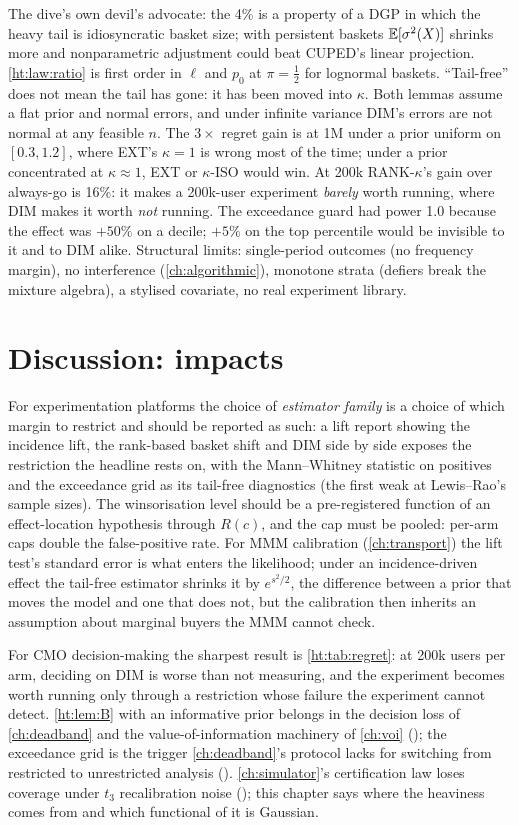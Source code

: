 The dive's own devil's advocate: the 4\% is a property of a DGP in which the heavy tail is idiosyncratic basket size; with persistent baskets $\mathbb{E}[\sigma^2(X)]$ shrinks more and nonparametric adjustment could beat CUPED's linear projection. \cref{ht:law:ratio} is first order in $\ell$ and $p_0$ at $\pi = \tfrac12$ for lognormal baskets. ``Tail-free'' does not mean the tail has gone: it has been moved into $\kappa$. Both lemmas assume a flat prior and normal errors, and under infinite variance DIM's errors are not normal at any feasible $n$. The $3\times$ regret gain is at 1M under a prior uniform on $[0.3, 1.2]$, where EXT's $\kappa = 1$ is wrong most of the time; under a prior concentrated at $\kappa \approx 1$, EXT or $\kappa$-ISO would win. At 200k RANK-$\kappa$'s gain over always-go is 16\%: it makes a 200k-user experiment \emph{barely} worth running, where DIM makes it worth \emph{not} running. The exceedance guard had power 1.0 because the effect was $+50\%$ on a decile; $+5\%$ on the top percentile would be invisible to it and to DIM alike. Structural limits: single-period outcomes (no frequency margin), no interference (\cref{ch:algorithmic}), monotone strata (defiers break the mixture algebra), a stylised covariate, no real experiment library.

\section{Discussion: impacts}

For experimentation platforms the choice of \emph{estimator family} is a choice of which margin to restrict and should be reported as such: a lift report showing the incidence lift, the rank-based basket shift and DIM side by side exposes the restriction the headline rests on, with the Mann--Whitney statistic on positives and the exceedance grid as its tail-free diagnostics (the first weak at Lewis--Rao's sample sizes). The winsorisation level should be a pre-registered function of an effect-location hypothesis through $R(c)$, and the cap must be pooled: per-arm caps double the false-positive rate. For MMM calibration (\cref{ch:transport}) the lift test's standard error is what enters the likelihood; under an incidence-driven effect the tail-free estimator shrinks it by $e^{s^2/2}$, the difference between a prior that moves the model and one that does not, but the calibration then inherits an assumption about marginal buyers the MMM cannot check.

For CMO decision-making the sharpest result is \cref{ht:tab:regret}: at 200k users per arm, deciding on DIM is worse than not measuring, and the experiment becomes worth running only through a restriction whose failure the experiment cannot detect. \cref{ht:lem:B} with an informative prior belongs in the decision loss of \cref{ch:deadband} and the value-of-information machinery of \cref{ch:voi} (); the exceedance grid is the trigger \cref{ch:deadband}'s protocol lacks for switching from restricted to unrestricted analysis (). \cref{ch:simulator}'s certification law loses coverage under $t_3$ recalibration noise (); this chapter says where the heaviness comes from and which functional of it is Gaussian.

